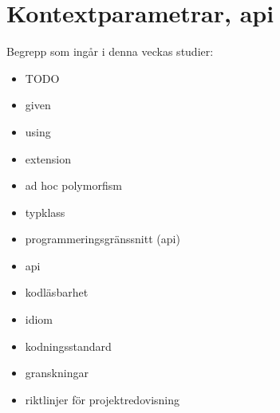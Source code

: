 \chapter{Kontextparametrar, api}\label{chapter:W11}
Begrepp som ingår i denna veckas studier:
\begin{itemize}[noitemsep,label={$\square$},leftmargin=*]
\item TODO
\item given
\item using
\item extension
\item ad hoc polymorfism
\item typklass
\item programmeringsgränssnitt (api)
\item api
\item kodläsbarhet
\item idiom
\item kodningsstandard
\item granskningar
\item riktlinjer för projektredovisning\end{itemize}

